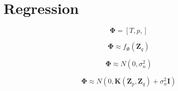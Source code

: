 \documentclass[20pt,twocolumn]{article}
\begin{document}
\section{Regression}

\begin{equation*}
\bm{\Phi} = [T, p, ]
\end{equation*}

\begin{equation*}
\bm{\Phi} \approx f_{\Phi} (\bm{Z}_q)
\end{equation*}

\begin{equation*}
\bm{\Phi} \approx N (0, \sigma_{n}^2)
\end{equation*}

\begin{equation*}
\bm{\Phi} \approx N (0, \bm{K}(\bm{Z}_p, \bm{Z}_q) + \sigma_{n}^2 \bm{I})
\end{equation*}
\end{document}
